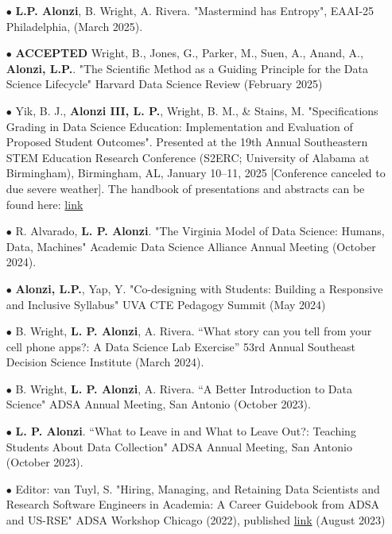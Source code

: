 \documentclass{article}[10pt]
\begin{document}
\begin{itemize}


\item [$\bullet$] {\bf L.P. Alonzi}, B. Wright, A. Rivera. "Mastermind has Entropy", EAAI-25 Philadelphia, (March 2025).

\item [$\bullet$] {\bf ACCEPTED} Wright, B., Jones, G., Parker, M., Suen, A., Anand, A., {\bf Alonzi, L.P.}. "The Scientific Method as a Guiding Principle for the Data Science Lifecycle" Harvard Data Science Review (February 2025)

\item[$\bullet$] Yik, B. J., {\bf Alonzi III, L. P.}, Wright, B. M., \& Stains, M. "Specifications Grading in Data Science Education: Implementation and Evaluation of Proposed Student Outcomes". Presented at the 19th Annual Southeastern STEM Education Research Conference (S2ERC; University of Alabama at Birmingham), Birmingham, AL, January 10–11, 2025 [Conference canceled to due severe weather]. The handbook of presentations and abstracts can be found here: \href{https://tsec.mtsu.edu/wp-content/uploads/sites/67/2025/01/SSERC-2025-Program-Abstracts-1.pdf}{link}

\item [$\bullet$] R. Alvarado, {\bf L. P. Alonzi}. "The Virginia Model of Data Science: Humans, Data, Machines" Academic Data Science Alliance Annual Meeting (October 2024). 

\item [$\bullet$] {\bf Alonzi, L.P.}, Yap, Y. "Co-designing with Students: Building a Responsive and Inclusive Syllabus" UVA CTE Pedagogy Summit (May 2024)

\item [$\bullet$] B. Wright, {\bf L. P. Alonzi}, A. Rivera. “What story can you tell from your cell phone apps?: A Data Science Lab Exercise” 53rd Annual Southeast Decision Science Institute (March 2024).

\item [$\bullet$] B. Wright, {\bf L. P. Alonzi}, A. Rivera. “A Better Introduction to Data Science" ADSA Annual Meeting, San Antonio (October 2023).

\item [$\bullet$] {\bf L. P. Alonzi}. “What to Leave in and What to Leave Out?: Teaching Students About Data Collection" ADSA Annual Meeting, San Antonio (October 2023).

\item [$\bullet$] Editor: van Tuyl, S. "Hiring, Managing, and Retaining Data Scientists and Research Software Engineers in Academia: A Career Guidebook from ADSA and US-RSE" ADSA Workshop Chicago (2022), published \href{https://zenodo.org/records/8329337}{link} (August 2023)


\end{itemize}
\end{document}
